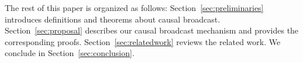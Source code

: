 The rest of this paper is organized as follows: Section~\ref{sec:preliminaries}
introduces definitions and theorems about causal
broadcast. Section~\ref{sec:proposal} describes our causal broadcast mechanism
and provides the corresponding proofs. Section~\ref{sec:relatedwork} reviews the
related work. We conclude in Section~\ref{sec:conclusion}.




